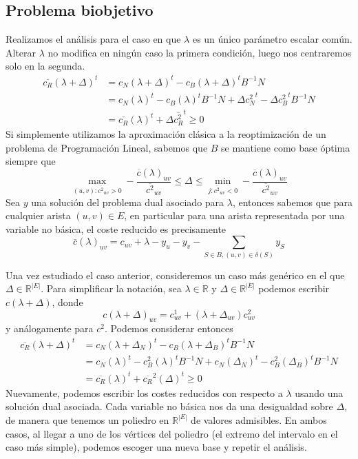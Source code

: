 \documentclass[twoside,a4paper,openright,12pt,tikz]{book}
\newcommand{\R}{\mathbb{R}}
\begin{document}
\subsection{Problema biobjetivo}
Realizamos el análisis para el caso en que $\lambda$ es un único parámetro escalar común. Alterar $\lambda$ no modifica en ningún caso la primera condición, luego nos centraremos solo en la segunda. 
\begin{align*}
\overline{c_R}(\lambda+\Delta)^t&= c_N(\lambda + \Delta)^t  - c_B(\lambda + \Delta)^t B^{-1}N \\
& = c_N(\lambda)^t  - c_B(\lambda)^t B^{-1}N + \Delta {c_N^2}^t  - \Delta {c_B^2}^t B^{-1}N \\
&= \overline{c_R}(\lambda)^t + \Delta \overline{c_R^2}^t \geq 0
\end{align*}
Si simplemente utilizamos la aproximación clásica a la reoptimización de un problema de Programación Lineal, sabemos que $B$ se mantiene como base óptima siempre que
$$
\max_{(u,v):\overline{c^2}_{uv}>0} -\frac{\overline{c}(\lambda)_{uv}}{\overline{c^2}_{uv}} \leq \Delta \leq \min_{j:\overline{c^2}_{uv}<0} - \frac{\overline{c}(\lambda)_{uv}}{\overline{c^2}_{uv}}
$$
Sea $y$ una solución del problema dual asociado para $\lambda$, entonces sabemos que para cualquier arista $(u,v)\in E$, en particular para una arista representada por una variable no básica, el coste reducido es precisamente 
$$
\overline{c}(\lambda)_{uv} =c_{uv}+\lambda-y_u-y_v - \sum_{S\in B, (u,v)\in \delta(S)}y_S
$$

Una vez estudiado el caso anterior, consideremos un caso más genérico en el que $\Delta \in \R^{|E|}$. Para simplificar la notación, sea $\lambda \in \R$ y $\Delta \in \R^{|E|}$ podemos escribir $c(\lambda+\Delta)$, donde
$$
c(\lambda+\Delta)_{uv} = c^1_{uv}+(\lambda+\Delta_{uv})c^2_{uv}
$$
y análogamente para $c^2$. Podemos considerar entonces
\begin{align*}
\overline{c_R}(\lambda+\Delta)^t&= c_N(\lambda + \Delta_N)^t  - c_B(\lambda + \Delta_B)^t B^{-1}N \\
& = c_N(\lambda)^t  - c_B^2(\lambda)^t B^{-1}N + c_N(\Delta_N)^t  - c_B^2(\Delta_B)^t B^{-1}N \\
&=\overline{c_R}(\lambda)^t + \overline{c_R}^2(\Delta)^t \geq 0
\end{align*}
Nuevamente, podemos escribir los costes reducidos con respecto a $\lambda$ usando una solución dual asociada. Cada variable no básica nos da una desigualdad sobre $\Delta$, de manera que tenemos un poliedro en $\R^{|E|}$ de valores admisibles. En ambos casos, al llegar a uno de los vértices del poliedro (el extremo del intervalo en el caso más simple), podemos escoger una nueva base y repetir el análisis.
\end{document}
